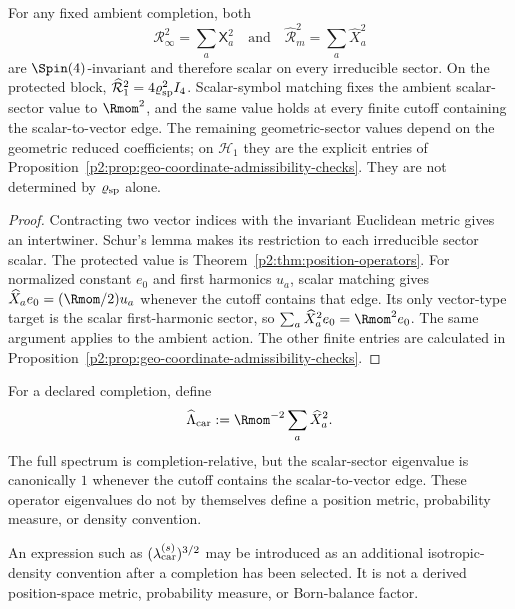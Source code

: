 \documentclass[12pt,a4paper]{article}
\begin{document}
\begin{proposition}
\label{p2:prop:sector-invariant-scalars}
For any fixed ambient completion, both
\[
\mathcal R_\infty^2=\sum_a\mathsf X_a^2
\quad\text{and}\quad
\widehat{\mathcal R}_m^2=\sum_a\widehat X_a^2
\]
are \(\Spin(4)\)-invariant and therefore scalar on every irreducible sector.
On the protected block,
$\widehat{\mathcal R}_1^2=4\varrho_{\rm sp}^2I_4$.
Scalar-symbol matching fixes the ambient scalar-sector value to $\Rmom^2$,
and the same value holds at every finite cutoff containing the
scalar-to-vector edge.
The remaining geometric-sector values depend on the geometric reduced
coefficients; on $\mathcal H_1$ they are the explicit entries of
Proposition~\ref{p2:prop:geo-coordinate-admissibility-checks}.
They are not determined by $\varrho_{\rm sp}$ alone.
\end{proposition}

\begin{proof}
Contracting two vector indices with the invariant Euclidean metric gives an
intertwiner.  Schur's lemma makes its restriction to each irreducible sector
scalar.  The protected value is
Theorem~\ref{p2:thm:position-operators}. For normalized constant $e_0$ and
first harmonics $u_a$, scalar matching gives $\widehat X_ae_0=(\Rmom/2)u_a$
whenever the cutoff contains that edge. Its only vector-type target is the
scalar first-harmonic sector, so $\sum_a\widehat X_a^2e_0=\Rmom^2e_0$.
The same argument applies to the ambient action. The other finite entries
are calculated in Proposition~\ref{p2:prop:geo-coordinate-admissibility-checks}.
\end{proof}

\begin{definition}
\label{p2:def:canonical-carrier-scale-scalar}
For a declared completion, define
\[
\widehat\Lambda_{\rm car}
:=
\Rmom^{-2}\sum_a\widehat X_a^2.
\]
The full spectrum is completion-relative, but the scalar-sector eigenvalue is
canonically $1$ whenever the cutoff contains the scalar-to-vector edge.
These operator eigenvalues do not by themselves define a position metric,
probability measure, or density convention.
\end{definition}

\begin{remark}
\label{p2:rem:radius-status}
\label{p2:cor:carrier-volume-density-factor}
An expression such as
\((\lambda_{\rm car}^{(s)})^{3/2}\) may be introduced as an additional
isotropic-density convention after a completion has been selected.  It is not
a derived position-space metric, probability measure, or Born-balance factor.
\end{remark}
\end{document}
